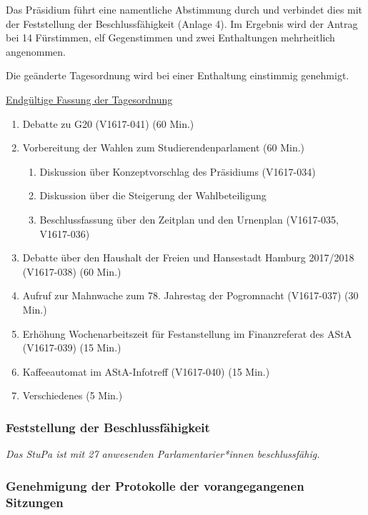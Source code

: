 \documentclass[ngerman,headheight=70pt]{scrartcl}
\begin{document}
    Das Präsidium führt eine namentliche Abstimmung durch und verbindet dies mit
    der Feststellung der Beschlussfähigkeit (Anlage 4). Im Ergebnis wird der
    Antrag bei 14 Fürstimmen, elf Gegenstimmen und zwei Enthaltungen mehrheitlich
    angenommen.

    Die geänderte Tagesordnung wird bei einer Enthaltung einstimmig genehmigt.

    \underline{Endgültige Fassung der Tagesordnung}
    \begin{enumerate}[label={\textbf{Top \theenumi}},leftmargin=*]
        \item Debatte zu G20 (V1617-041) (60 Min.)
        \item Vorbereitung der Wahlen zum Studierendenparlament (60 Min.)
        \begin{enumerate}
            \item Diskussion über Konzeptvorschlag des Präsidiums (V1617-034)
            \item Diskussion über die Steigerung der Wahlbeteiligung
            \item Beschlussfassung über den Zeitplan und den Urnenplan
            (V1617-035, V1617-036)
        \end{enumerate}
        \item Debatte über den Haushalt der Freien und Hansestadt Hamburg
              2017/2018 (V1617-038) (60 Min.)
        \item Aufruf zur Mahnwache zum 78. Jahrestag der Pogromnacht (V1617-037) (30 Min.)
        \item Erhöhung Wochenarbeitszeit für Festanstellung im Finanzreferat des AStA (V1617-039) (15 Min.)
        \item Kaffeeautomat im AStA-Infotreff (V1617-040) (15 Min.)
        \item Verschiedenes (5 Min.)
    \end{enumerate}

    \subsubsection{Feststellung der Beschlussfähigkeit}

    \textit{Das StuPa ist mit 27 anwesenden Parlamentarier*innen beschlussfähig.}

    \subsubsection{Genehmigung der Protokolle der vorangegangenen Sitzungen}
\end{document}
